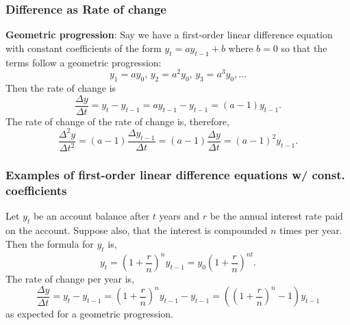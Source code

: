 \documentclass[../MathsNotesBase.tex]{subfiles}
\begin{document}
{		\biggerskip
		\subsubsection{Difference as Rate of change}
		\biggerskip
		\textbf{Geometric progression}: Say we have a first-order linear difference equation with constant coefficients of the form ${ y_t = ay_{t-1} + b }$ where ${ b = 0 }$ so that the terms follow a geometric progression:
		\[ y_1 = ay_0,\, y_2 = a^2y_0,\, y_3 = a^3y_0, \dots \]
		Then the rate of change is
		\[ \frac{\Delta y}{\Delta t} = y_t - y_{t-1} = ay_{t-1} - y_{t-1} = (a - 1)y_{t-1}. \]
		The rate of change of the rate of change is, therefore,
		\[ \frac{\Delta^2 y}{\Delta t^2} = (a - 1)\frac{\Delta y_{t-1}}{\Delta t} = (a - 1)\frac{\Delta y}{\Delta t} = (a - 1)^2 y_{t-1}. \]
	
		\bigskip
		\subsubsection{Examples of first-order linear difference equations w/ const. coefficients}
		\begin{exe}
			\item{Let $y_t$ be an account balance after $t$ years and $r$ be the annual interest rate paid on the account. Suppose also, that the interest is compounded $n$ times per year. Then the formula for $y_t$ is,
				\[ y_t = \left(1 + \frac{r}{n}\right)^n y_{t-1} = y_0 \left(1 + \frac{r}{n}\right)^{nt}. \]
				The rate of change per year is,
				\[ \frac{\Delta y}{\Delta t} = y_t - y_{t-1} = \left(1 + \frac{r}{n}\right)^n y_{t-1} - y_{t-1} = \left(\left(1 + \frac{r}{n}\right)^n - 1\right) y_{t-1} \]
				as expected for a geometric progression.\\
				
}
\end{exe}}
\end{document}
